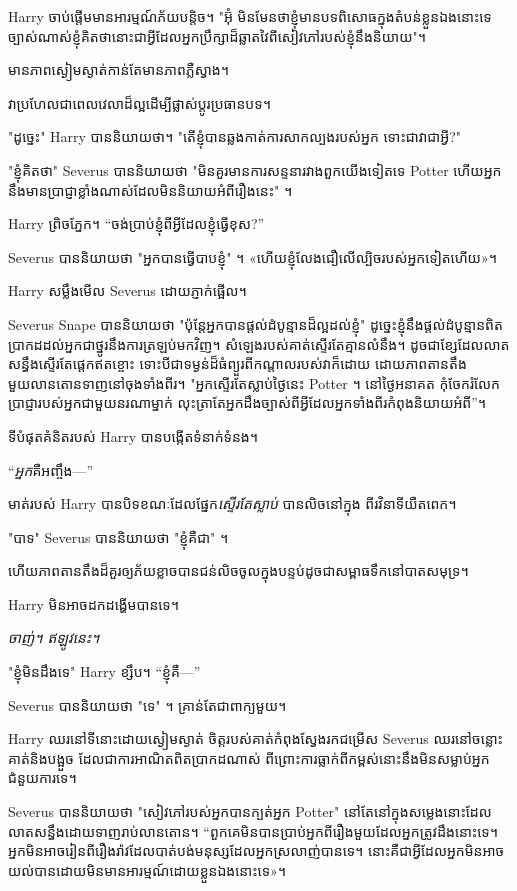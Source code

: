 {{{{{Harry ចាប់ផ្តើមមានអារម្មណ៍ភ័យបន្តិច។ "អ៊ុំ មិនមែន​ថា​ខ្ញុំ​មាន​បទ​ពិសោធ​ក្នុង​តំបន់​ខ្លួន​ឯង​នោះ​ទេ ច្បាស់​ណាស់​ខ្ញុំ​គិត​ថា​នោះ​ជា​អ្វី​ដែល​អ្នក​ប្រឹក្សា​ដ៏​ឆ្លាត​វៃ​ពី​សៀវភៅ​របស់​ខ្ញុំ​នឹង​និយាយ"។

មាន​ភាព​ស្ងៀម​ស្ងាត់​កាន់​តែ​មាន​ភាព​ភ្លឺ​ស្វាង។

វាប្រហែលជាពេលវេលាដ៏ល្អដើម្បីផ្លាស់ប្តូរប្រធានបទ។

"ដូច្នេះ" Harry បាននិយាយថា។ "តើខ្ញុំបានឆ្លងកាត់ការសាកល្បងរបស់អ្នក ទោះជាវាជាអ្វី?"

"ខ្ញុំគិតថា" Severus បាននិយាយថា "មិនគួរមានការសន្ទនារវាងពួកយើងទៀតទេ Potter ហើយអ្នកនឹងមានប្រាជ្ញាខ្លាំងណាស់ដែលមិននិយាយអំពីរឿងនេះ" ។

Harry ព្រិចភ្នែក។ “ចង់ប្រាប់ខ្ញុំពីអ្វីដែលខ្ញុំធ្វើខុស?”

Severus បាននិយាយថា "អ្នកបានធ្វើបាបខ្ញុំ" ។ «ហើយ​ខ្ញុំ​លែង​ជឿ​លើ​ល្បិច​របស់​អ្នក​ទៀត​ហើយ»។

Harry សម្លឹងមើល Severus ដោយភ្ញាក់ផ្អើល។

Severus Snape បាននិយាយថា "ប៉ុន្តែអ្នកបានផ្តល់ដំបូន្មានដ៏ល្អដល់ខ្ញុំ" ដូច្នេះខ្ញុំនឹងផ្តល់ដំបូន្មានពិតប្រាកដដល់អ្នកជាថ្នូរនឹងការត្រឡប់មកវិញ។ សំឡេងរបស់គាត់ស្ទើរតែគ្មានលំនឹង។ ដូចជាខ្សែដែលលាតសន្ធឹងស្ទើរតែផ្ដេកឥតខ្ចោះ ទោះបីជាទម្ងន់ដ៏ធំព្យួរពីកណ្តាលរបស់វាក៏ដោយ ដោយភាពតានតឹងមួយលានតោនទាញនៅចុងទាំងពីរ។ "អ្នកស្ទើរតែស្លាប់ថ្ងៃនេះ Potter ។ នៅថ្ងៃអនាគត កុំចែករំលែកប្រាជ្ញារបស់អ្នកជាមួយនរណាម្នាក់ លុះត្រាតែអ្នកដឹងច្បាស់ពីអ្វីដែលអ្នកទាំងពីរកំពុងនិយាយអំពី”។

ទីបំផុតគំនិតរបស់ Harry បានបង្កើតទំនាក់ទំនង។

“\emph{អ្នក}គឺអញ្ចឹង—”

មាត់របស់ Harry បានបិទខណៈដែលផ្នែក\emph{ស្ទើរតែស្លាប់} បានលិចនៅក្នុង ពីរវិនាទីយឺតពេក។

"បាទ" Severus បាននិយាយថា "ខ្ញុំគឺជា" ។

ហើយ​ភាព​តានតឹង​ដ៏​គួរ​ឲ្យ​ភ័យខ្លាច​បាន​ជន់​លិច​ចូល​ក្នុង​បន្ទប់​ដូច​ជា​សម្ពាធ​ទឹក​នៅ​បាត​សមុទ្រ។

Harry មិនអាចដកដង្ហើមបានទេ។

\emph{ចាញ់។ ឥឡូវនេះ។}

"ខ្ញុំមិនដឹងទេ" Harry ខ្សឹប។ “ខ្ញុំ​គឺ—”

Severus បាននិយាយថា "ទេ" ។ គ្រាន់​តែ​ជា​ពាក្យ​មួយ​។

Harry ឈរនៅទីនោះដោយស្ងៀមស្ងាត់ ចិត្តរបស់គាត់កំពុងស្វែងរកជម្រើស Severus ឈរនៅចន្លោះគាត់និងបង្អួច ដែលជាការអាណិតពិតប្រាកដណាស់ ពីព្រោះការធ្លាក់ពីកម្ពស់នោះនឹងមិនសម្លាប់អ្នកជំនួយការទេ។

Severus បាននិយាយថា "សៀវភៅរបស់អ្នកបានក្បត់អ្នក Potter" នៅតែនៅក្នុងសម្លេងនោះដែលលាតសន្ធឹងដោយទាញរាប់លានតោន។ “ពួកគេមិនបានប្រាប់អ្នកពីរឿងមួយដែលអ្នកត្រូវដឹងនោះទេ។ អ្នក​មិន​អាច​រៀន​ពី​រឿង​រ៉ាវ​ដែល​បាត់​បង់​មនុស្ស​ដែល​អ្នក​ស្រលាញ់​បាន​ទេ។ នោះ​គឺ​ជា​អ្វី​ដែល​អ្នក​មិន​អាច​យល់​បាន​ដោយ​មិន​មាន​អារម្មណ៍​ដោយ​ខ្លួន​ឯង​នោះ​ទេ»។

}}}}}
